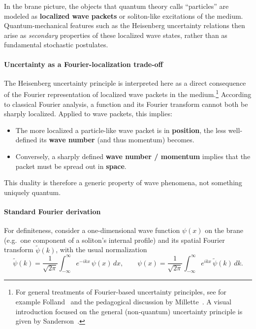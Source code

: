 In the brane picture, the objects that quantum theory calls
``particles'' are modeled as \textbf{localized wave packets} or soliton-like
excitations of the medium. Quantum-mechanical features such as the
Heisenberg uncertainty relations then arise as \emph{secondary} properties
of these localized wave states, rather than as fundamental stochastic
postulates.

\paragraph{Uncertainty as a Fourier-localization
trade-off}\label{uncertainty-as-fourier}

The Heisenberg uncertainty principle is interpreted here as a direct
consequence of the Fourier representation of localized wave packets in
the medium.\footnote{For general treatments of Fourier-based uncertainty
principles, see for example
Folland~\cite{FollandUncertaintyPrinciple,FollandSitaram1997} and the
pedagogical discussion by Millette~\cite{Millette2013HUPNyquist}. A
visual introduction focused on the general (non-quantum) uncertainty
principle is given by Sanderson~\cite{ThreeBlueoneBrownUncertainty}.}
According to classical Fourier analysis, a function and its Fourier
transform cannot both be sharply localized.\cite{FollandUncertaintyPrinciple}
Applied to wave packets, this implies:

\begin{itemize}
\tightlist
\item
  The more localized a particle-like wave packet is in
  \textbf{position}, the less well-defined its \textbf{wave number} (and
  thus momentum) becomes.
\item
  Conversely, a sharply defined \textbf{wave number / momentum} implies
  that the packet must be spread out in \textbf{space}.
\end{itemize}

This duality is therefore a generic property of wave phenomena, not
something uniquely quantum.

\paragraph{Standard Fourier derivation}\label{standard-fourier-derivation}

For definiteness, consider a one-dimensional wave function
$\psi(x)$ on the brane (e.g.\ one component of a soliton's internal
profile) and its spatial Fourier transform $\tilde\psi(k)$, with the
usual normalization
\[
\tilde{\psi}(k)
  = \frac{1}{\sqrt{2\pi}}\int_{-\infty}^{\infty}
      e^{-ikx}\,\psi(x)\,dx, \qquad
\psi(x)
  = \frac{1}{\sqrt{2\pi}}\int_{-\infty}^{\infty}
      e^{ikx}\,\tilde{\psi}(k)\,dk.
\]

